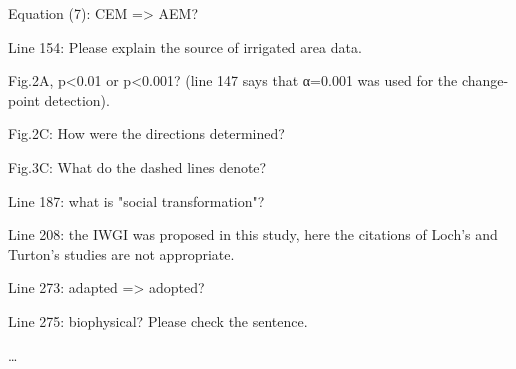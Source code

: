 \RC{} Equation (7): CEM => AEM?\

\RC{} Line 154: Please explain the source of irrigated area data.

\RC{} Fig.2A, p<0.01 or p<0.001? (line 147 says that α=0.001 was used for the change-point detection).

\RC{} Fig.2C: How were the directions determined?

\RC{} Fig.3C: What do the dashed lines denote?

\RC{} Line 187: what is "social transformation"?

\RC{} Line 208: the IWGI was proposed in this study, here the citations of Loch's and Turton's studies are not appropriate.

\RC{} Line 273: adapted => adopted?

\RC{} Line 275: biophysical? Please check the sentence.

\AR{} \dots
